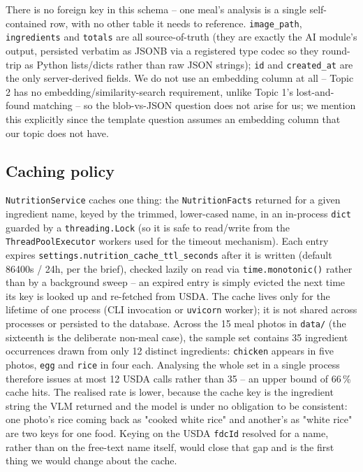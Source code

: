 \documentclass[11pt,a4paper]{article}
\begin{document}
There is no foreign key in this schema -- one meal's analysis is a single self-contained row, with no other table it needs to reference. \texttt{image\_path}, \texttt{ingredients} and \texttt{totals} are all source-of-truth (they are exactly the AI module's output, persisted verbatim as JSONB via a registered type codec so they round-trip as Python lists/dicts rather than raw JSON strings); \texttt{id} and \texttt{created\_at} are the only server-derived fields. We do not use an embedding column at all -- Topic 2 has no embedding/similarity-search requirement, unlike Topic 1's lost-and-found matching -- so the blob-vs-JSON question does not arise for us; we mention this explicitly since the template question assumes an embedding column that our topic does not have.

\subsection{Caching policy}

\texttt{NutritionService} caches one thing: the \texttt{NutritionFacts} returned for a given ingredient name, keyed by the trimmed, lower-cased name, in an in-process \texttt{dict} guarded by a \texttt{threading.Lock} (so it is safe to read/write from the \texttt{ThreadPoolExecutor} workers used for the timeout mechanism). Each entry expires \texttt{settings.nutrition\_cache\_ttl\_seconds} after it is written (default 86400s / 24h, per the brief), checked lazily on read via \texttt{time.monotonic()} rather than by a background sweep -- an expired entry is simply evicted the next time its key is looked up and re-fetched from USDA. The cache lives only for the lifetime of one process (CLI invocation or \texttt{uvicorn} worker); it is not shared across processes or persisted to the database. Across the 15 meal photos in \texttt{data/} (the sixteenth is the deliberate non-meal case), the sample set contains 35 ingredient occurrences drawn from only 12 distinct ingredients: \texttt{chicken} appears in five photos, \texttt{egg} and \texttt{rice} in four each. Analysing the whole set in a single process therefore issues at most 12 USDA calls rather than 35 -- an upper bound of 66\,\% cache hits. The realised rate is lower, because the cache key is the ingredient string the VLM returned and the model is under no obligation to be consistent: one photo's rice coming back as "cooked white rice" and another's as "white rice" are two keys for one food. Keying on the USDA \texttt{fdcId} resolved for a name, rather than on the free-text name itself, would close that gap and is the first thing we would change about the cache.
\end{document}
